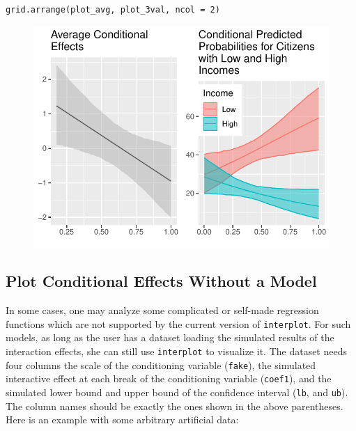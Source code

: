 \documentclass[
  article]{jss}
\begin{document}
\begin{verbatim}
grid.arrange(plot_avg, plot_3val, ncol = 2)
\end{verbatim}

\begin{figure}[H]

{\centering \includegraphics{jss_manuscript_files/figure-pdf/unnamed-chunk-18-1.pdf}

}

\end{figure}

\hypertarget{sec-plot-conditional-effects-without-a-model}{%
\subsection{Plot Conditional Effects Without a
Model}\label{sec-plot-conditional-effects-without-a-model}}

In some cases, one may analyze some complicated or self-made regression
functions which are not supported by the current version of
\texttt{interplot}. For such models, as long as the user has a dataset
loading the simulated results of the interaction effects, she can still
use \texttt{interplot} to visualize it. The dataset needs four columns
the scale of the conditioning variable (\texttt{fake}), the simulated
interactive effect at each break of the conditioning variable
(\texttt{coef1}), and the simulated lower bound and upper bound of the
confidence interval (\texttt{lb}, and \texttt{ub}). The column names
should be exactly the ones shown in the above parentheses. Here is an
example with some arbitrary artificial data:
\end{document}
